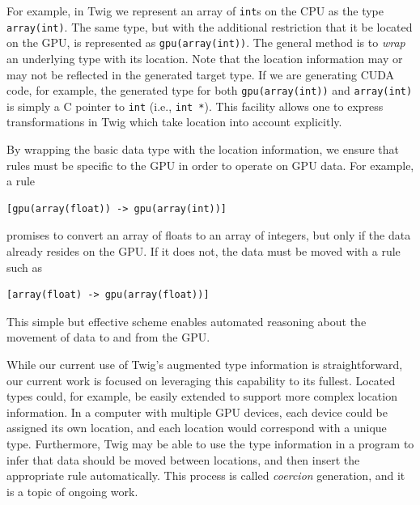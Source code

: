 For example, in Twig we represent an array of \texttt{int}s on the CPU as the
type \texttt{array(int)}. The same type, but with the additional restriction
that it be located on the GPU, is represented as \texttt{gpu(array(int))}. The
general method is to \emph{wrap} an underlying type with its location. Note that
the location information may or may not be reflected in the generated target
type. If we are generating CUDA code, for example, the generated type for both
\texttt{gpu(array(int))} and \texttt{array(int)} is simply a C pointer to
\texttt{int} (i.e., \texttt{int *}). This facility allows one to express
transformations in Twig which take location into account explicitly.

By wrapping the basic data type with the location information, we ensure that
rules must be specific to the GPU in order to operate on GPU data. For example,
a rule

\begin{verbatim}
[gpu(array(float)) -> gpu(array(int))]
\end{verbatim}

promises to convert an array of floats to an array of integers, but only if the
data already resides on the GPU. If it does not, the data must be moved with a
rule such as

\begin{verbatim}
[array(float) -> gpu(array(float))]
\end{verbatim}

This simple but effective scheme enables automated reasoning about the movement
of data to and from the GPU.

While our current use of Twig's augmented type information is straightforward,
our current work is focused on leveraging this capability to its fullest.
Located types could, for example, be easily extended to support more complex
location information. In a computer with multiple GPU devices, each device could
be assigned its own location, and each location would correspond with a unique
type. Furthermore, Twig may be able to use the type information in a program to
infer that data should be moved between locations, and then insert the
appropriate rule automatically. This process is called \emph{coercion}
generation, and it is a topic of ongoing work.
